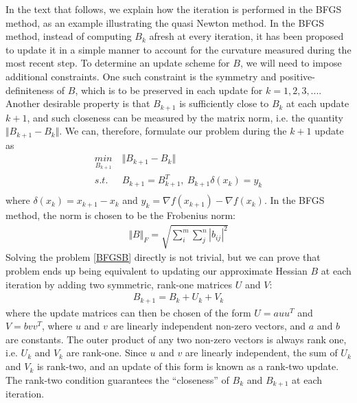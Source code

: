 \documentclass  [
  paper    = a4,
  BCOR     = 10mm,
  twoside,
  fontsize = 12pt,
  fleqn,
  toc      = bibnumbered,
  toc      = listofnumbered,
  numbers  = noendperiod,
  headings = normal,
  listof   = leveldown,
  version  = 3.03
]                                       {scrreprt}
\newcommand{\<}{\langle}
\renewcommand{\>}{\rangle}
\begin{document}
In the text that follows, we explain how the iteration is performed in the BFGS method, as an example illustrating the quasi Newton method. In the BFGS method, instead of computing $B_k$ afresh at every iteration, it has been proposed to update it in a simple manner to account for the curvature measured during the most recent step. To determine an update scheme for $B$, we will need to impose additional constraints. One such constraint is the symmetry and positive-definiteness of $B$, which is to be preserved in each update for $k = 1,2, 3, ...$. Another desirable property is that $B_{k+1}$ is sufficiently close to $B_k$ at each update $k+1$, and such closeness can be measured by the matrix norm, i.e. the quantity $\Vert B_{k+1} - B_{k} \Vert$. We can, therefore, formulate our problem during the $k+1$ update as 
\begin{equation}
	\begin{aligned}
		\underset{B_{k+1}}{min} \  &  \Vert B_{k+1} - B_{k} \Vert\\
		s.t.\ \  & B_{k+1}= B_{k+1}^T, \ B_{k+1}\delta(x_k)  = y_k \\
	\end{aligned}
	\label{BFGSB}
\end{equation}
where $\delta(x_k) = x_{k+1} -x_k$ and $y_k = \nabla f(x_{k+1}) - \nabla f(x_k)$. In the BFGS method, the norm is chosen to be the Frobenius norm:
\begin{align*}
	\Vert B \Vert_F = \sqrt{\sum_{i}^{m} \sum_{j}^{n} |b_{ij}|^2} 
\end{align*}
Solving the problem \ref{BFGSB} directly is not trivial, but we can prove that problem ends up being equivalent to updating our approximate Hessian $B$ at each iteration by adding two symmetric, rank-one matrices $U$ and $V$:
\begin{align*}
	B_{k+1} = B_k + U_k + V_k
\end{align*}
where the update matrices can then be chosen of the form $U = a u u^T$ and $V = b v v^T$, where $u$ and $v$ are linearly independent non-zero vectors, and $a$ and $b$ are constants.  The outer product of any two non-zero vectors is always rank one, i.e. $U_k$ and $V_k$ are rank-one. Since $u$ and $v$ are linearly independent, the sum of $U_k$ and $V_k$ is rank-two, and an update of this form is known as a rank-two update. The rank-two condition guarantees the “closeness” of $B_k$ and $B_{k+1}$ at each iteration. 
\end{document}
